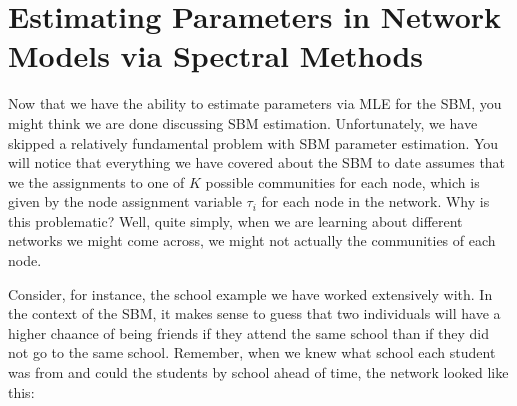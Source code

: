 \documentclass[letterpaper,10pt,english]{jupyterBook}
\begin{document}
\section{Estimating Parameters in Network Models via Spectral Methods}
\label{\detokenize{representations/ch6/estimating-parameters_spectral:estimating-parameters-in-network-models-via-spectral-methods}}\label{\detokenize{representations/ch6/estimating-parameters_spectral::doc}}
\sphinxAtStartPar
Now that we have the ability to estimate parameters via MLE for the SBM, you might think we are done discussing SBM estimation. Unfortunately, we have skipped a relatively fundamental problem with SBM parameter estimation. You will notice that everything we have covered about the SBM to date assumes that we the assignments to one of \(K\) possible communities for each node, which is given by the node assignment variable \(\tau_i\) for each node in the network. Why is this problematic? Well, quite simply, when we are learning about  different networks we might come across, we might not actually  the communities of each node.

\sphinxAtStartPar
Consider, for instance, the school example we have worked extensively with. In the context of the SBM, it makes sense to guess that two individuals will have a higher chaance of being friends if they attend the same school than if they did not go to the same school. Remember, when we knew what school each student was from and could  the students by school ahead of time, the network looked like this:

\begin{sphinxVerbatim}[commandchars=\\\{\}]
   
   
   

  \PYG{p}{[} \PYG{p}{]}  
  \PYG{p}{[}\PYG{p}{[} \PYG{p}{]} \PYG{p}{[} \PYG{p}{]}\PYG{p}{]}  

     
  \PYG{p}{[}     \PYG{p}{]}  \PYG{p}{[}     \PYG{p}{]}
\end{sphinxVerbatim}
\end{document}

